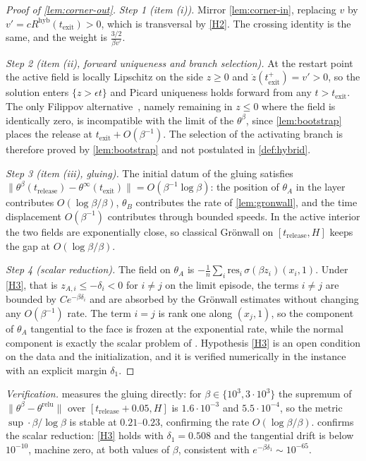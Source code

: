 \documentclass[11pt]{article}
\theoremstyle{definition}
\theoremstyle{remark}
\newcommand{\texit}{t_{\mathrm{exit}}}
\newcommand{\trel}{t_{\mathrm{release}}}
\newcommand{\hyb}{\mathrm{hyb}}
\begin{document}
\begin{proof}[Proof of \cref{lem:corner-out}]
\emph{Step 1 (item (i)).} Mirror \cref{lem:corner-in}, replacing $v$ by
$v'=cR^{\hyb}(\texit)>0$, which is transversal by \eqref{H2}. The crossing
identity is the same, and the weight is $\tfrac{3/2}{\beta v'}$.

\emph{Step 2 (item (ii), forward uniqueness and branch selection).} At the
restart point the active field is locally Lipschitz on the side $z\ge0$ and
$\dot z(\texit^+)=v'>0$, so the solution enters $\{z>\epsilon t\}$ and Picard
uniqueness holds forward from any $t>\texit$. The only Filippov
alternative~\cite{Fil88}, namely remaining in $z\le0$ where the field is
identically zero, is incompatible with the limit of the $\theta^\beta$, since
\cref{lem:bootstrap} places the release at $\texit+O(\beta^{-1})$. The selection
of the activating branch is therefore proved by \cref{lem:bootstrap} and not
postulated in \cref{def:hybrid}.

\emph{Step 3 (item (iii), gluing).} The initial datum of the gluing satisfies
$\|\theta^\beta(\trel)-\theta^\infty(\texit)\|=O(\beta^{-1}\log\beta)$: the
position of $\theta_A$ in the layer contributes $O(\log\beta/\beta)$, $\theta_B$
contributes the rate of \cref{lem:gronwall}, and the time displacement
$O(\beta^{-1})$ contributes through bounded speeds. In the active interior the
two fields are exponentially close, so classical Gr\"onwall on $[\trel,H]$ keeps
the gap at $O(\log\beta/\beta)$.

\emph{Step 4 (scalar reduction).} The field on $\theta_A$ is
$-\tfrac1n\sum_i\mathrm{res}_i\,\sigma(\beta z_i)(x_i,1)$. Under \eqref{H3}, that
is $z_{A,i}\le-\delta_i<0$ for $i\ne j$ on the limit episode, the terms $i\ne j$
are bounded by $Ce^{-\beta\delta_i}$ and are absorbed by the Gr\"onwall estimates
without changing any $O(\beta^{-1})$ rate. The term $i=j$ is rank one along
$(x_j,1)$, so the component of $\theta_A$ tangential to the face is frozen at the
exponential rate, while the normal component is exactly the scalar problem of
. Hypothesis \eqref{H3} is an open condition
on the data and the initialization, and it is verified numerically in the
instance with an explicit margin $\delta_1$.
\end{proof}

\noindent\emph{Verification.}  measures the
gluing directly: for $\beta\in\{10^3,3\cdot10^3\}$ the supremum of
$\|\theta^\beta-\theta^{\mathrm{relu}}\|$ over $[\trel+0.05,H]$ is
$1.6\cdot10^{-3}$ and $5.5\cdot10^{-4}$, so the metric $\sup\cdot\beta/\log\beta$
is stable at $0.21$--$0.23$, confirming the rate $O(\log\beta/\beta)$.
 confirms the scalar reduction: \eqref{H3} holds
with $\delta_1=0.508$ and the tangential drift is below $10^{-10}$, machine zero,
at both values of $\beta$, consistent with $e^{-\beta\delta_1}\sim10^{-65}$.
\end{document}
